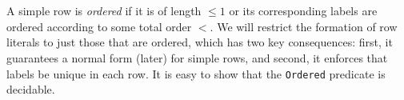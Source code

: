 \documentclass[authoryear, acmsmall, screen, review, nonacm]{acmart}
\begin{document}
\begin{code}%
\>[0]\AgdaSpace{}%
\AgdaSymbol{:}\AgdaSpace{}%
\AgdaSymbol{(}\AgdaSpace{}%
\AgdaSymbol{:}\AgdaSpace{}%
\AgdaSpace{}%
\AgdaSpace{}%
\AgdaSpace{}%
\AgdaSpace{}%
\AgdaSymbol{)}\AgdaSpace{}%
\AgdaSpace{}%
\AgdaSpace{}%
\AgdaSpace{}%
\AgdaSpace{}%
\AgdaSpace{}%
\<%
\\
\>[0]\AgdaSpace{}%
\AgdaSpace{}%
\AgdaSpace{}%
\AgdaOperator{\AgdaInductiveConstructor{R[}}\AgdaSpace{}%
\AgdaSpace{}%
\AgdaOperator{\AgdaInductiveConstructor{]}}%
\>[24]\AgdaSymbol{=}\AgdaSpace{}%
\AgdaSpace{}%
\AgdaSymbol{(}\AgdaSpace{}%
\AgdaSpace{}%
\AgdaSpace{}%
\AgdaSpace{}%
\AgdaSymbol{)}\<%
\\
\>[0]\AgdaSpace{}%
\AgdaCatchallClause{\AgdaSymbol{\AgdaUnderscore{}}}\AgdaSpace{}%
\AgdaCatchallClause{\AgdaSymbol{\AgdaUnderscore{}}}\AgdaSpace{}%
\AgdaCatchallClause{\AgdaSymbol{\AgdaUnderscore{}}}\AgdaSpace{}%
\AgdaSymbol{=}\AgdaSpace{}%
\<%
\end{code} 

A simple row is \emph{ordered} if it is of length $\leq 1$ or its corresponding labels are ordered according to some total order $<$. We will restrict the formation of row literals to just those that are ordered, which has two key consequences: first, it guarantees a normal form (later) for simple rows, and second, it enforces that labels be unique in each row. It is easy to show that the \verb!Ordered! predicate is decidable.
\end{document}
